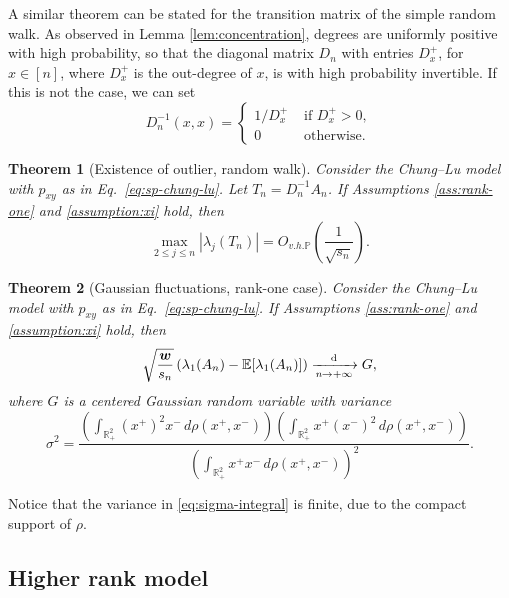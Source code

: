 \documentclass[11pt,oneside]{amsart}
\theoremstyle{plain}
\newtheorem{theorem}{Theorem}[section]
\numberwithin{equation}{section}
\newcommand{\R}{\mathbb{R}}
\newcommand{\E}{\mathbb{E}}
\newcommand{\p}{\mathbb{P}}
\newcommand{\dconv}{\xrightarrow[\textit{n} \to +\infty]{\quad {\rm d} \quad}}
\newcommand{\w}{\boldsymbol{w}}
\newcommand{\scaling}{s_n}
\newcommand{\Ohp}{O_{v.h.\p}}
\begin{document}
A similar theorem can be stated for the transition matrix of the simple random walk. As observed in Lemma \ref{lem:concentration}, degrees are uniformly positive with high probability, so that the diagonal matrix $D_n$ with entries $D_x^+$, for $x \in [n]$, where $D_x^+$ is the out-degree of $x$, is with high probability invertible. If this is not the case, we can set 
\begin{equation}
    D^{-1}_n(x,x) = \begin{cases} 1/D_x^+ & \text{ if $D_x^+>0$}, \\ 0 &\text{ otherwise}.
    \end{cases}
\end{equation}
\begin{theorem}[Existence of outlier, random walk] 
Consider the Chung--Lu model with $p_{xy}$ as in Eq.\ \eqref{eq:sp-chung-lu}.
Let $T_n=D_n^{-1}A_n$.  If Assumptions \ref{ass:rank-one} and \ref{assumption:xi} hold, then
\label{thm:LLN-T}
\begin{equation}
  \max_{ 2 \le j\le n}|\lambda_j(T_n)| = \Ohp\left(\frac{1}{\sqrt{\scaling}}\right).
\end{equation}
\end{theorem}

\begin{theorem}[Gaussian fluctuations, rank-one case] \label{thm:CLT-A}
Consider the Chung--Lu model with $p_{xy}$ as in Eq.\ \eqref{eq:sp-chung-lu}.
If Assumptions \ref{ass:rank-one} and \ref{assumption:xi} hold,
then
\begin{equation}
    \sqrt{\frac{\w}{\scaling}}\left(\lambda_1(A_n)- \E[\lambda_1(A_n)] \right)\dconv G,
   \end{equation}
where $G$ is a  centered Gaussian random variable with variance 
    \begin{equation} \label{eq:sigma-integral}
        \sigma^2=
        \frac{\displaystyle  \left(\int_{\R^{2}_+} (x^+)^2x^- \,d\rho(x^+,x^-)\right)\left(\int_{\R^{2}_+} x^+(x^-)^2 \,d\rho(x^+,x^-)\right)}{\displaystyle  \left(\int_{\R^{2}_+} x^+x^- \,d\rho(x^+,x^-)\right)^2}.
    \end{equation}
\end{theorem}
Notice that the variance in \eqref{eq:sigma-integral} is finite, due to the compact support of $\rho$.



\subsection{Higher rank model}
\end{document}
